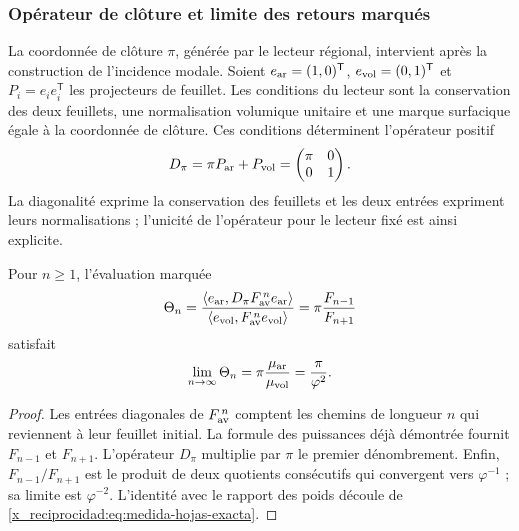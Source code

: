 \subsubsection{Opérateur de clôture et limite des retours marqués}
\label{x_reciprocidad:sec:operador-retorno-marcado}

La coordonnée de clôture \(\pi\), générée par le lecteur régional, intervient après la construction de l'incidence modale. Soient \(e_{\rm ar}=(1,0)^{\mathsf T}\), \(e_{\rm vol}=(0,1)^{\mathsf T}\) et \(P_i=e_ie_i^{\mathsf T}\) les projecteurs de feuillet. Les conditions du lecteur sont la conservation des deux feuillets, une normalisation volumique unitaire et une marque surfacique égale à la coordonnée de clôture. Ces conditions déterminent l'opérateur positif
\begin{equation}
 D_\pi=\pi P_{\rm ar}+P_{\rm vol}
       =\begin{pmatrix}\pi&0\\0&1\end{pmatrix}.
 \label{x_reciprocidad:eq:operador-marca-pi}
\end{equation}
La diagonalité exprime la conservation des feuillets et les deux entrées
expriment leurs normalisations ; l'unicité de
l'opérateur pour le lecteur fixé est ainsi explicite.

\begin{proposition}
Pour \(n\geq1\), l'évaluation marquée
\begin{equation}
 \Theta_n=
 \frac{\langle e_{\rm ar},D_\pi F_{\rm av}^{\,n}e_{\rm ar}\rangle}
 {\langle e_{\rm vol},F_{\rm av}^{\,n}e_{\rm vol}\rangle}
 =\pi\frac{F_{n-1}}{F_{n+1}}
 \label{x_reciprocidad:eq:retorno-marcado-finito}
\end{equation}
satisfait
\begin{equation}
 \lim_{n\to\infty}\Theta_n
 =\pi\frac{\mu_{\rm ar}}{\mu_{\rm vol}}
 =\frac{\pi}{\varphi^2}.
 \label{x_reciprocidad:eq:retorno-marcado-limite}
\end{equation}
\end{proposition}
\begin{proof}
Les entrées diagonales de \(F_{\rm av}^{\,n}\) comptent les chemins
de longueur \(n\) qui reviennent à leur feuillet initial. La formule des puissances
déjà démontrée fournit \(F_{n-1}\) et \(F_{n+1}\). L'opérateur
\(D_\pi\) multiplie par \(\pi\) le premier dénombrement. Enfin,
\(F_{n-1}/F_{n+1}\) est le produit de deux quotients consécutifs
qui convergent vers \(\varphi^{-1}\) ; sa limite est
\(\varphi^{-2}\). L'identité avec le rapport des poids découle de
\eqref{x_reciprocidad:eq:medida-hojas-exacta}.
\end{proof}

